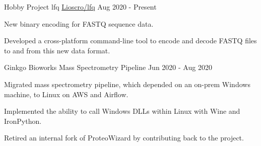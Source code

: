

\begin{cventries}

\cventry
  {Hobby Project} %
  {lfq} %
  {\faGithub\phantom{a}\href{https://github.com/Lioscro/lfq}{Lioscro/lfq}} %
  {Aug 2020 - Present} %
  {
    \begin{cvitems} %
      \item {New binary encoding for FASTQ sequence data.}
      \item {Developed a cross-platform command-line tool to encode and decode FASTQ files to and from this new data format.}
    \end{cvitems}
  }

\cventry
  {Ginkgo Bioworks} %
  {Mass Spectrometry Pipeline} %
  {} %
  {Jun 2020 - Aug 2020} %
  {
    \begin{cvitems} %
      \item {Migrated mass spectrometry pipeline, which depended on an on-prem Windows machine, to Linux on AWS and Airflow.}
      \item {Implemented the ability to call Windows DLLs within Linux with Wine and IronPython.}
      \item {Retired an internal fork of ProteoWizard by contributing back to the project.}
    \end{cvitems}
  }



\end{cventries}
